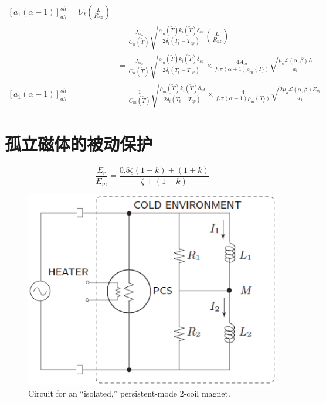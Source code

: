 \begin{subequations}%
	\begin{align*}
[a_1(\alpha-1)]_{ah}^{sh}=U_t\left(\frac{L}{R_{nz}}\right) \\
&=\frac{J_{m_o}}{C_n(\tilde{T})}\sqrt{\frac{\rho_m(\tilde{T})k_i(\tilde{T})\delta_{cd}}{2\delta_i(T_t-T_{op})}}\left(\frac{L}{R_{nz}}\right)  \\
&=\frac{J_{m_o}}{C_n(\tilde{T})}\sqrt{\frac{\rho_m(\tilde{T})k_i(\tilde{T})\delta_{cd}}{2\delta_i(T_t-T_{op})}}\times 
\frac{4A_m}{f_r\pi(\alpha+1)\rho_m(T_f)}\sqrt{\frac{\mu_o\mathcal{L}(\alpha,\beta)L}{a_1}}\\
[a_1(\alpha-1)]_{ah}^{sh}&=\frac{1}{C_m(\tilde{T})}\sqrt{\frac{\rho_m(\tilde{T})k_i(\tilde{T})\delta_{cd}}{2\delta_i(T_t-T_{op})}}\times 
\frac{4}{f_r\pi(\alpha+1)\rho_m(T_f)}\sqrt{\frac{2\mu_o\mathcal{L}(\alpha,\beta)E_m}{a_1}}
\end{align*}
\end{subequations}



\section{孤立磁体的被动保护}

\begin{equation}%
\frac{E_r}{E_m}=\frac{0.5\zeta(1-k)+(1+k)}{\zeta+(1+k)}
\end{equation}


\begin{figure}
	\centering
	\includegraphics[scale=0.6]{chpt8/figs/fig8.13.eps}
	\caption{Circuit for an “isolated,” persistent-mode 2-coil magnet.}
\end{figure}





